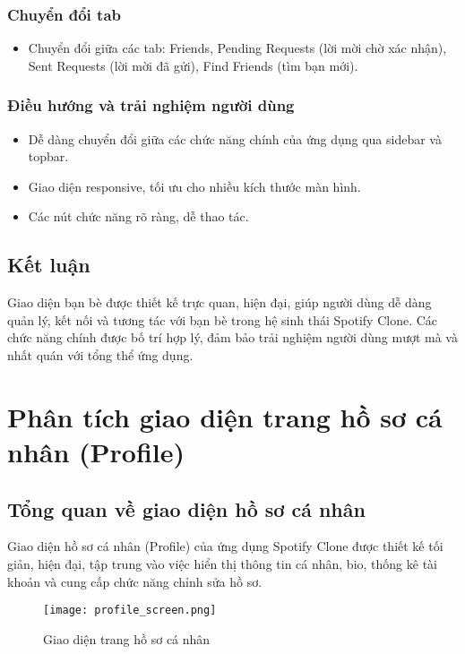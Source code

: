\documentclass{book}
\let\oldsection\section
\renewcommand{\section}{\clearpage\oldsection}
\begin{document}
\subsubsection{Chuyển đổi tab}
\begin{itemize}
    \item Chuyển đổi giữa các tab: Friends, Pending Requests (lời mời chờ xác nhận), Sent Requests (lời mời đã gửi), Find Friends (tìm bạn mới).
\end{itemize}

\subsubsection{Điều hướng và trải nghiệm người dùng}
\begin{itemize}
    \item Dễ dàng chuyển đổi giữa các chức năng chính của ứng dụng qua sidebar và topbar.
    \item Giao diện responsive, tối ưu cho nhiều kích thước màn hình.
    \item Các nút chức năng rõ ràng, dễ thao tác.
\end{itemize}

\subsection{Kết luận}
Giao diện bạn bè được thiết kế trực quan, hiện đại, giúp người dùng dễ dàng quản lý, kết nối và tương tác với bạn bè trong hệ sinh thái Spotify Clone. Các chức năng chính được bố trí hợp lý, đảm bảo trải nghiệm người dùng mượt mà và nhất quán với tổng thể ứng dụng.

\section{Phân tích giao diện trang hồ sơ cá nhân (Profile)}

\subsection{Tổng quan về giao diện hồ sơ cá nhân}
Giao diện hồ sơ cá nhân (Profile) của ứng dụng Spotify Clone được thiết kế tối giản, hiện đại, tập trung vào việc hiển thị thông tin cá nhân, bio, thống kê tài khoản và cung cấp chức năng chỉnh sửa hồ sơ.

\begin{figure}[h!]
\centering
\texttt{[image: profile\_screen.png]} %
\caption{Giao diện trang hồ sơ cá nhân}
\label{fig:profile}
\end{figure}
\end{document}
